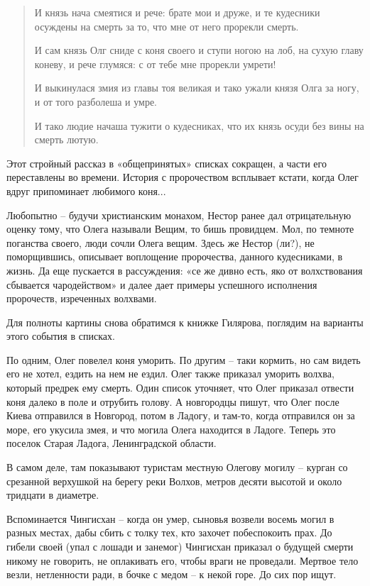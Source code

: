 \begin{quotation}
И князь нача смеятися и рече: брате мои и друже, и те кудесники осуждены на смерть за то, что мне от него прорекли смерть.

И сам князь Олг сниде с коня своего и ступи ногою на лоб, на сухую главу коневу, и рече глумяся: с от тебе мне прорекли умрети!

И выкинулася змия из главы тоя великая и тако ужали князя Олга за ногу, и от того разболеша и умре.

И тако людие начаша тужити о кудесниках, что их князь осуди без вины на смерть лютую.
\end{quotation}

Этот стройный рассказ в «общепринятых» списках сокращен, а части его переставлены во времени. История с пророчеством всплывает кстати, когда Олег вдруг припоминает любимого коня...

Любопытно – будучи христианским монахом, Нестор ранее дал отрицательную оценку тому, что Олега называли Вещим, то бишь провидцем. Мол, по темноте поганства своего, люди сочли Олега вещим. Здесь же Нестор (ли?), не поморщившись, описывает воплощение пророчества, данного кудесниками, в жизнь. Да еще пускается в рассуждения: «се же дивно есть, яко от волхствования сбывается чародейством» и далее дает примеры успешного исполнения пророчеств, изреченных волхвами.

Для полноты картины снова обратимся к книжке Гилярова, поглядим на варианты этого события в списках.

По одним, Олег повелел коня уморить. По другим – таки кормить, но сам видеть его не хотел, ездить на нем не ездил. Олег также приказал уморить волхва, который предрек ему смерть. Один список уточняет, что Олег приказал отвести коня далеко в поле и отрубить голову. А новгородцы пишут, что Олег после Киева отправился в Новгород, потом в Ладогу, и там-то, когда отправился он за море, его укусила змея, и что могила Олега находится в Ладоге. Теперь это поселок Старая Ладога, Ленинградской области.

В самом деле, там показывают туристам местную Олегову могилу – курган со срезанной верхушкой на берегу реки Волхов, метров десяти высотой и около тридцати в диаметре.

Вспоминается Чингисхан – когда он умер, сыновья возвели восемь могил в разных местах, дабы сбить с толку тех, кто захочет побеспокоить прах. До гибели своей (упал с лошади и занемог) Чингисхан приказал о будущей смерти никому не говорить, не оплакивать его, чтобы враги не проведали. Мертвое тело везли,  нетленности ради, в бочке с медом – к некой горе. До сих пор ищут.

